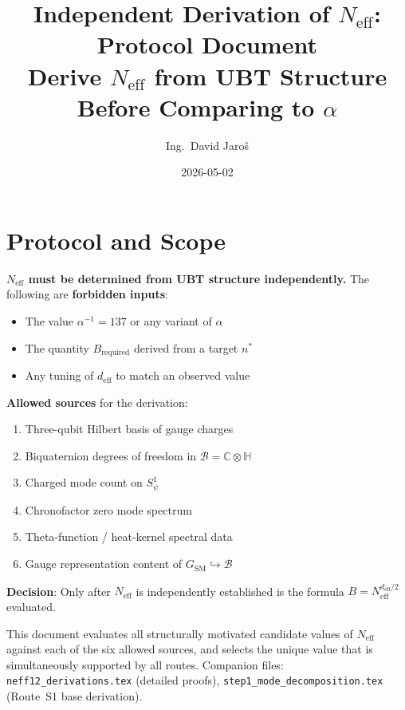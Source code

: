 \documentclass[12pt,a4paper]{article}
\title{\textbf{Independent Derivation of $N_{\mathrm{eff}}$: Protocol Document}\\[6pt]
         \large Derive $N_{\mathrm{eff}}$ from UBT Structure Before Comparing to $\alpha$}
\author{Ing.\ David Jaro\v{s}}
\date{2026-05-02}
\theoremstyle{definition}
\theoremstyle{remark}
\begin{document}
  \maketitle
  \tableofcontents
  \bigskip
\fi

\section{Protocol and Scope}
\label{sec:protocol}

\begin{tcolorbox}[colback=red!4!white,colframe=red!60!black,title=Critical Constraint]
\textbf{$N_{\mathrm{eff}}$ must be determined from UBT structure independently.}
The following are \textbf{forbidden inputs}:
\begin{itemize}
  \item The value $\alpha^{-1} = 137$ or any variant of $\alpha$
  \item The quantity $B_{\mathrm{required}}$ derived from a target $n^*$
  \item Any tuning of $d_{\mathrm{eff}}$ to match an observed value
\end{itemize}
\textbf{Allowed sources} for the derivation:
\begin{enumerate}
  \item Three-qubit Hilbert basis of gauge charges
  \item Biquaternion degrees of freedom in $\mathcal{B} = \mathbb{C}\otimes\mathbb{H}$
  \item Charged mode count on $S^1_\psi$
  \item Chronofactor zero mode spectrum
  \item Theta-function / heat-kernel spectral data
  \item Gauge representation content of $G_{\mathrm{SM}}\hookrightarrow\mathcal{B}$
\end{enumerate}
\textbf{Decision}: Only after $N_{\mathrm{eff}}$ is independently established is the
formula $B = N_{\mathrm{eff}}^{d_{\mathrm{eff}}/2}$ evaluated.
\end{tcolorbox}

\medskip
This document evaluates all structurally motivated candidate values of $N_{\mathrm{eff}}$
against each of the six allowed sources, and selects the unique value that is
simultaneously supported by all routes.
Companion files: \texttt{neff12\_derivations.tex} (detailed proofs),
\texttt{step1\_mode\_decomposition.tex} (Route~S1 base derivation).
\end{document}
